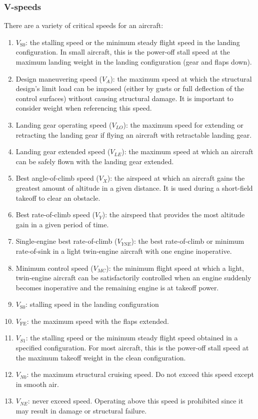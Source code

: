 \documentclass[12pt]{article}
\begin{document}
		\subsubsection{V-speeds}
			There are a variety of critical speeds for an aircraft:
			\begin{enumerate}
				\item $V_\text{S0}$: the stalling speed or the minimum steady flight speed in the landing configuration. In small aircraft, this is the power-off stall speed at the maximum landing weight in the landing configuration (gear and flaps down).
				\item Design maneuvering speed ($V_A$): the maximum speed at which the structural design’s limit load can be imposed (either by gusts or full deflection of the control surfaces) without causing structural damage. It is important to consider weight when referencing this speed.
				\item Landing gear operating speed ($V_{LO}$): the maximum speed for extending or retracting the landing gear if flying an aircraft with retractable landing gear.
				\item Landing gear extended speed ($V_{LE}$): the maximum speed at which an aircraft can be safely flown with the landing gear extended.
				\item Best angle-of-climb speed ($V_X$): the airspeed at which an aircraft gains the greatest amount of altitude in a given distance. It is used during a short-field takeoff to clear an obstacle.
				\item Best rate-of-climb speed ($V_Y$): the airspeed that provides the most altitude gain in a given period of time.
				\item Single-engine best rate-of-climb ($V_{YSE}$): the best rate-of-climb or minimum rate-of-sink in a light twin-engine aircraft with one engine inoperative.
				\item Minimum control speed ($V_{MC}$): the minimum flight speed at which a light, twin-engine aircraft can be satisfactorily controlled when an engine suddenly becomes inoperative and the remaining engine is at takeoff power.
				\item $V_\text{S0}$: stalling speed in the landing configuration
				\item $V_\text{FE}$: the maximum speed with the flaps extended.
				\item $V_{S1}$: the stalling speed or the minimum steady flight speed obtained in a specified configuration. For most aircraft, this is the power-off stall speed at the maximum takeoff weight in the clean configuration.
				\item $V_{N0}$: the maximum structural cruising speed. Do not exceed this speed except in smooth air.
				\item $V_{NE}$: never exceed speed. Operating above this speed is prohibited since it may result in damage or structural failure.
			\end{enumerate}
\end{document}
